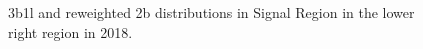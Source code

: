 \begin{figure}[ht]
 
 
    \caption{3b1l and reweighted 2b distributions in Signal Region in the lower right region in 2018.}
    \label{fig:lower-right-3b1l-SR-2018}
\end{figure}


